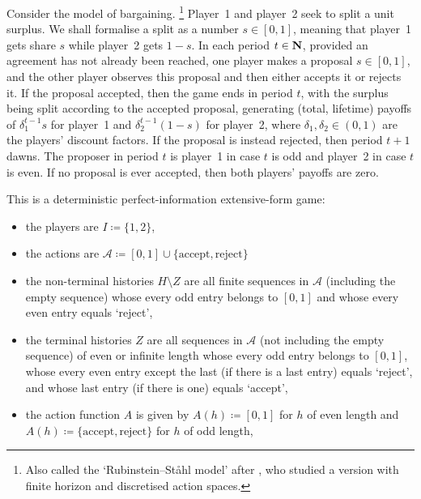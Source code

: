 \begin{example}
	\label{example:rubinstein}
	Consider the \textcite{Rubinstein1982} model of bargaining.%
		\footnote{Also called the `Rubinstein--Ståhl model' after \textcite{Stahl1972,Stahl1977}, who studied a version with finite horizon and discretised action spaces.}
	Player~1 and player~2 seek to split a unit surplus. We shall formalise a split as a number $s \in [0,1]$, meaning that player~1 gets share $s$ while player~2 gets $1-s$. In each period $t \in \mathbf{N}$, provided an agreement has not already been reached, one player makes a proposal $s \in [0,1]$, and the other player observes this proposal and then either accepts it or rejects it. If the proposal accepted, then the game ends in period $t$, with the surplus being split according to the accepted proposal, generating (total, lifetime) payoffs of $\delta_1^{t-1} s$ for player~1 and $\delta_2^{t-1} (1-s)$ for player~2, where $\delta_1,\delta_2 \in (0,1)$ are the players' discount factors. If the proposal is instead rejected, then period $t+1$ dawns. The proposer in period $t$ is player~1 in case $t$ is odd and player~2 in case $t$ is even. If no proposal is ever accepted, then both players' payoffs are zero.

	This is a deterministic perfect-information extensive-form game:
	\begin{itemize}
	
		\item the players are $I \coloneqq \{1,2\}$,

		\item the actions are $\mathcal{A} \coloneqq [0,1] \cup \{\text{accept},\text{reject}\}$

		\item the non-terminal histories $H \setminus Z$ are all finite sequences in $\mathcal{A}$ (including the empty sequence) whose every odd entry belongs to $[0,1]$ and whose every even entry equals `reject',

		\item the terminal histories $Z$ are all sequences in $\mathcal{A}$ (not including the empty sequence) of even or infinite length whose every odd entry belongs to $[0,1]$, whose every even entry except the last (if there is a last entry) equals `reject', and whose last entry (if there is one) equals `accept',

		\item the action function $A$ is given by $A(h) \coloneqq [0,1]$ for $h$ of even length and $A(h) \coloneqq \{ \text{accept}, \text{reject} \}$ for $h$ of odd length,


\end{itemize}
\end{example}
